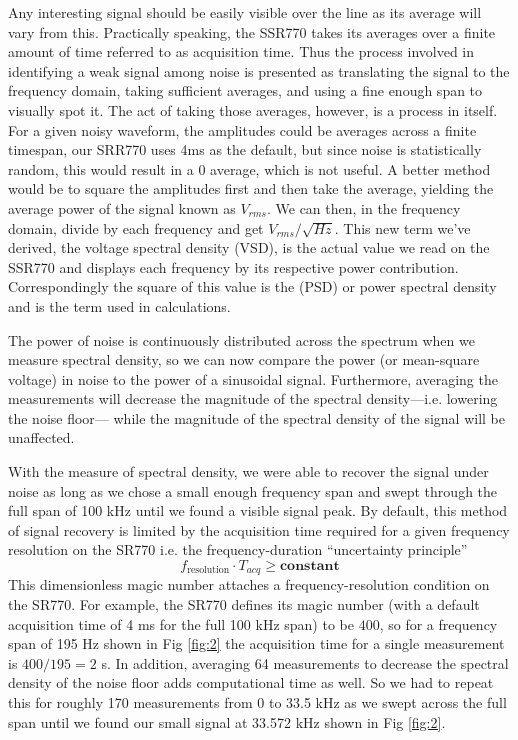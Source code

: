 \documentclass[prl,twocolumn,superscriptaddress,floatfix]{revtex4}
\begin{document}
Any interesting signal should be easily visible over the line as its average will vary from this.
Practically speaking, the SSR770 takes its averages over a finite amount of time referred to as acquisition time.
Thus the process involved in identifying a weak signal among noise is presented as translating the signal to the frequency domain, taking sufficient averages, and using a fine enough span to visually spot it.
The act of taking those averages, however, is a process in itself. For a given noisy waveform, the amplitudes could be averages across a finite timespan, our SRR770 uses 4ms as the default, but since noise is statistically random, this would result in a 0 average, which is not useful. 
A better method would be to square the amplitudes first and then take the average, yielding the average power of the signal known as $V_{rms}$. 
We can then, in the frequency domain, divide by each frequency and get $V_{rms}/\sqrt{Hz}$. 
This new term we've derived, the voltage spectral density (VSD), is the actual value we read on the SSR770 and displays each frequency by its respective power contribution. Correspondingly the square of this value is the (PSD) or power spectral density and is the term used in calculations.

The power of noise is continuously distributed across the spectrum when we measure spectral density, so we can now compare the power (or mean-square voltage) in noise to the power of a sinusoidal signal. Furthermore, averaging the measurements will decrease the magnitude of the spectral density---i.e. lowering the noise floor--- while the magnitude of the spectral density of the signal will be unaffected. 

With the measure of spectral density, we were able to recover the signal under noise as long as we chose a small enough frequency span and swept through the full span of 100 kHz until we found a visible signal peak. 
By default, this method of signal recovery is limited by the acquisition time required for a given frequency resolution on the SR770\cite{fouriermethods} i.e.
the frequency-duration ``uncertainty principle''
\begin{equation}
    f_\textrm{resolution} \cdot T_{acq} \geq \textbf{constant}
\end{equation}
This dimensionless magic number attaches a frequency-resolution condition on the SR770. For example,
the SR770 defines its magic number (with a default acquisition time of 4 ms for the full 100 kHz span)
to be $400$, so for a frequency span of 195 Hz shown in Fig \ref{fig:2} the acquisition time for a single measurement is $400 / 195 = 2$ s. In addition, averaging 64 measurements to decrease the spectral density of the noise floor adds computational time as well. So we had to repeat this for roughly 170 measurements from 0 to 33.5 kHz as we swept across the full span until we found our small signal at 33.572 kHz shown in Fig \ref{fig:2}.
\end{document}

